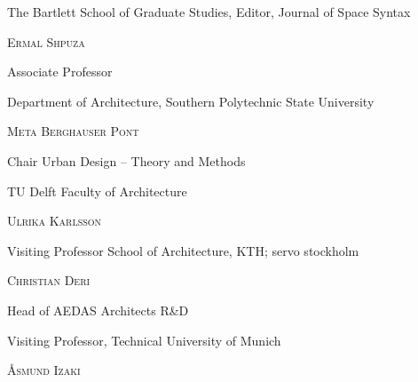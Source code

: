 \documentclass[english]{article}
\newcommand{\noun}[1]{\textsc{#1}}
\begin{document}
\textit{\large \hfill{}}The Bartlett School of Graduate Studies,
Editor, Journal of Space Syntax\textit{\large \hfill{}\hfill{}}{\large \par}

\bigskip{}


\textit{\large \hfill{}}\noun{Ermal Shpuza}\textit{\large \hfill{}\hfill{}}{\large \par}

\textit{\large \hfill{}}Associate Professor\textit{\large \hfill{}\hfill{}}{\large \par}

\textit{\large \hfill{}}Department of Architecture, Southern Polytechnic
State University\textit{\large \hfill{}\hfill{}}{\large \par}

\bigskip{}


\textit{\large \hfill{}}\noun{Meta Berghauser Pont}\textit{\large \hfill{}\hfill{}}{\large \par}

\textit{\large \hfill{}}Chair Urban Design – Theory and Methods\textit{\large \hfill{}\hfill{}}{\large \par}

\textit{\large \hfill{}}TU Delft Faculty of Architecture\textit{\large \hfill{}\hfill{}}{\large \par}

\bigskip{}


\textit{\large \hfill{}}\noun{Ulrika Karlsson}\textit{\large \hfill{}\hfill{}}{\large \par}

\textit{\large \hfill{}}Visiting Professor School of Architecture,
KTH; servo stockholm\textit{\large \hfill{}\hfill{}}{\large \par}

\bigskip{}


\textit{\large \hfill{}}\noun{Christian Deri}\textit{\large \hfill{}\hfill{}}{\large \par}

\textit{\large \hfill{}}Head of AEDAS Architects R\&D\textit{\large \hfill{}\hfill{}}{\large \par}

\textit{\large \hfill{}}Visiting Professor, Technical University
of Munich\textit{\large \hfill{}\hfill{}}{\large \par}

\bigskip{}


\textit{\large \hfill{}}\noun{Åsmund Izaki}\textit{\large \hfill{}\hfill{}}{\large \par}
\end{document}
